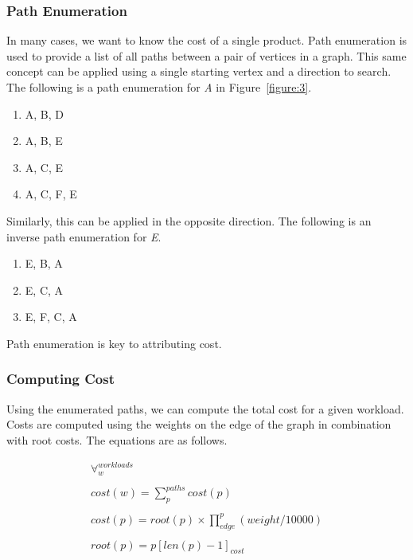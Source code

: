 \documentclass[10pt, a4paper, twocolumn]{article}
\begin{document}
    \subsubsection*{Path Enumeration}
      In many cases, we want to know the cost of a single product.
      Path enumeration is used to provide a list of all paths between a pair of vertices in a graph.
      This same concept can be applied using a single starting vertex and a direction to search.
      The following is a path enumeration for \textit{A} in Figure~\ref{figure:3}.

      \begin{enumerate}
        \item A, B, D
        \item A, B, E
        \item A, C, E
        \item A, C, F, E
      \end{enumerate}

      Similarly, this can be applied in the opposite direction.
      The following is an inverse path enumeration for \textit{E}.

      \begin{enumerate}
        \item E, B, A
        \item E, C, A
        \item E, F, C, A
      \end{enumerate}

      Path enumeration is key to attributing cost.

    \subsubsection*{Computing Cost}
      Using the enumerated paths, we can compute the total cost for a given workload.
      Costs are computed using the weights on the edge of the graph in combination with root costs.
      The equations are as follows.

      \begin{gather*}
        \forall^{workloads}_{w} \\
        \\
        cost(w) = \sum^{paths}_{p} cost(p) \\
        \\
        cost(p) = root(p) \times \prod^{p}_{edge} (weight / 10000) \\
        \\
        root(p) = p[len(p) - 1]_{cost} \\
      \end{gather*}
\end{document}
